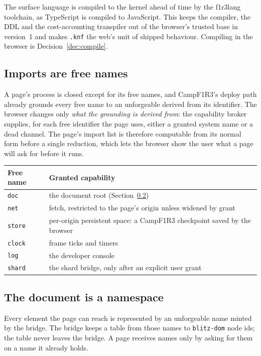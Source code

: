 \documentclass[11pt]{article}
\theoremstyle{definition}
\theoremstyle{remark}
\newcommand{\fl}{f1r3lang}
\newcommand{\Camp}{CampF1R3}
\newcommand{\code}[1]{\texttt{#1}}
\begin{document}
The surface language is compiled to the kernel ahead of time by the \fl{} toolchain,
as TypeScript is compiled to JavaScript. This keeps the compiler, the DDL and the
cost-accounting transpiler out of the browser's trusted base in version~1 and makes
\code{.knf} the web's unit of shipped behaviour. Compiling in the browser is
Decision~\ref{dec:compile}.

\subsection{Imports are free names}

A page's process is closed except for its free names, and \Camp{}'s deploy path
already grounds every free name to an unforgeable derived from its identifier. The
browser changes only \emph{what the grounding is derived from}: the capability
broker supplies, for each free identifier the page uses, either a granted system
name or a dead channel. The page's import list is therefore computable from its
normal form before a single reduction, which lets the browser show the user what a
page will ask for before it runs.

\begin{center}
\begin{tabularx}{\linewidth}{@{}lX@{}}
\toprule
Free name & Granted capability\\
\midrule
\code{doc} & the document root (Section~\ref{sec:dom})\\
\code{net} & fetch, restricted to the page's origin unless widened by grant\\
\code{store} & per-origin persistent space: a \Camp{} checkpoint saved by the browser\\
\code{clock} & frame ticks and timers\\
\code{log} & the developer console\\
\code{shard} & the shard bridge, only after an explicit user grant\\
\bottomrule
\end{tabularx}
\end{center}

\subsection{The document is a namespace}\label{sec:dom}

Every element the page can reach is represented by an unforgeable name minted by the
bridge. The bridge keeps a table from those names to \code{blitz-dom} node ids;
the table never leaves the bridge. A page receives names only by asking for them on a
name it already holds.
\end{document}
